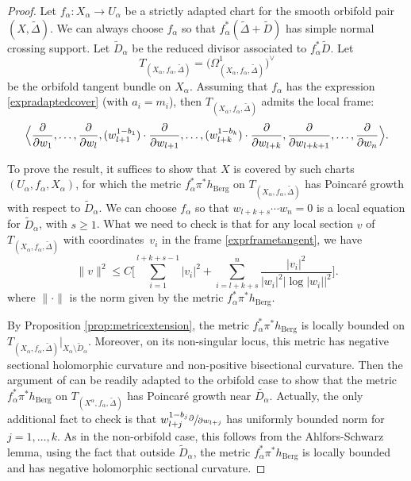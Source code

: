 \documentclass[JEP,XML,SOM,Unicode]{cedram}
\theoremstyle{plain}
\theoremstyle{definition}
\numberwithin{equation}{theorem}
\newcommand{\norm}[1] { \| #1 \| }
\begin{document}
\begin{proof}
Let $f_\alpha : X_\alpha \to U_\alpha$ be a strictly adapted chart for the smooth orbifold pair $(X, \widetilde{\Delta})$. We can always choose $f_\alpha$ so that $f_\alpha^\ast (\widetilde{\Delta} + \widetilde{D})$ has simple normal crossing support. Let $\widetilde{D}_\alpha$ be the reduced divisor associated to $f^\ast_\alpha \widetilde{D}$. Let
\[
T_{(X_\alpha, f_\alpha, \widetilde{\Delta})} = \bigl( \Omega^1_{(X_\alpha, f_\alpha, \widetilde{\Delta})} \bigr)^{\vee}
\]
be the orbifold tangent bundle on $X_\alpha$. Assuming that $f_\alpha$ has the expression \eqref{expradaptedcover} (with $a_i = m_i$), then $T_{(X_\alpha, f_\alpha, \widetilde{\Delta})}$ admits the local frame:
\begin{equation} \label{exprframetangent}
\Bigl\langle \frac{\partial}{\partial w_1} , \ldots, \frac{\partial}{\partial w_l}, (w^{1 - b_1}_{l+1})\cdot \frac{\partial}{\partial w_{l+1}}, \ldots, (w^{1 - b_k}_{l+k})\cdot \frac{\partial}{\partial w_{l+k}},
\frac{\partial}{\partial w_{l+k+1}}, \ldots, \frac{\partial}{\partial w_n} \Bigr\rangle.
\end{equation}

To prove the result, it suffices to show that $X$ is covered by such charts $(U_\alpha, f_\alpha, X_\alpha)$, for which the metric $f_\alpha^\ast \pi^\ast h_{\mathrm{Berg}}$ on $T_{(X_\alpha, f_\alpha, \widetilde{\Delta})}$ has Poincaré growth with respect to $\widetilde{D}_\alpha$. We can choose $f_\alpha$ so that $w_{l+k+s} \cdots w_{n} = 0$ is a local equation for $\widetilde{D}_\alpha$, with $s \geq 1$. What we need to check is that for any local section $v$ of $T_{(X_\alpha, f_\alpha, \widetilde{\Delta})}$ with coordinates~$v_i$ in the frame \eqref{exprframetangent}, we have
$$
\norm{v}^2 \leq C \biggl[ \sum_{i =1}^{l+ k + s - 1} |v_i|^2 + \sum_{i=l+k+s}^{n} \frac{|v_i|^2}{|w_i|^2 \left| \log |w_i| \right|^2} \biggr].
$$
where $\norm{\cdot}$ is the norm given by the metric $f_\alpha^\ast \pi^\ast h_{\mathrm{Berg}}$.

By Proposition \ref{prop:metricextension}, the metric $f^\ast_\alpha \pi^\ast h_{\mathrm{Berg}}$ is locally bounded on $T_{(X_\alpha, f_\alpha, \widetilde{\Delta})}|_{X_\alpha \setminus \widetilde{D}_\alpha}$. Moreover, on its non-singular locus, this metric has negative sectional holomorphic curvature and non-positive bisectional curvature. Then the argument of \cite[Prop.\,2.4]{BC18} can be readily adapted to the orbifold case to show that the metric $f^\ast_\alpha \pi^\ast h_{\mathrm{Berg}}$ on $T_{(X^\alpha, f_\alpha, \widetilde{\Delta})}$ has Poincaré growth near $\widetilde{D_\alpha}$. Actually, the only additional fact to check is that $w_{l+j}^{1 - b_{j}}\sfrac{\partial}{\partial w_{l+j}}$ has uniformly bounded norm for $j = 1, \ldots, k$. As in the non-orbifold case, this follows from the Ahlfors-Schwarz lemma, using the fact that outside $\widetilde{D}_\alpha$, the metric $f_\alpha^\ast \pi^\ast h_\mathrm{Berg}$ is locally bounded and has negative holomorphic sectional curvature.
\end{proof}
\end{document}
